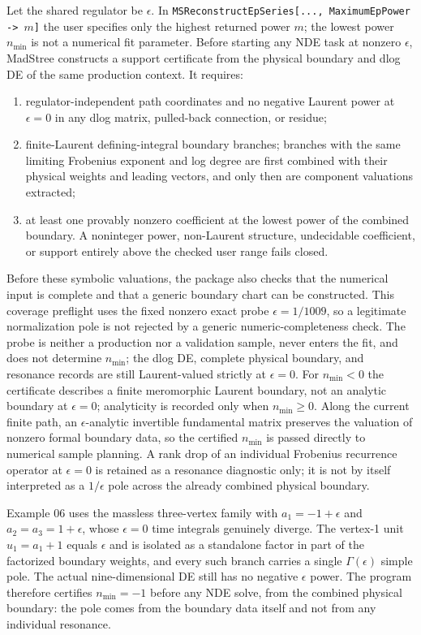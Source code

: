\documentclass[11pt,a4paper]{article}
\begin{document}
Let the shared regulator be $\epsilon$.  In
\texttt{MSReconstructEpSeries[..., MaximumEpPower -> $m$]} the user specifies only the
highest returned power $m$; the lowest power $n_{\min}$ is not a numerical fit parameter.
Before starting any NDE task at nonzero $\epsilon$, MadStree constructs a support certificate
from the physical boundary and dlog DE of the same production context.  It requires:
\begin{enumerate}[label=\arabic*.]
  \item regulator-independent path coordinates and no negative Laurent power at
  $\epsilon=0$ in any dlog matrix, pulled-back connection, or residue;
  \item finite-Laurent defining-integral boundary branches; branches with the same limiting
  Frobenius exponent and log degree are first combined with their physical weights and leading
  vectors, and only then are component valuations extracted;
  \item at least one provably nonzero coefficient at the lowest power of the combined boundary.
  A noninteger power, non-Laurent structure, undecidable coefficient, or support entirely above
  the checked user range fails closed.
\end{enumerate}
Before these symbolic valuations, the package also checks that the numerical input is complete and
that a generic boundary chart can be constructed. This coverage preflight uses the fixed nonzero
exact probe $\epsilon=1/1009$, so a legitimate normalization pole is not rejected by a generic
numeric-completeness check. The probe is neither a production nor a validation sample, never enters
the fit, and does not determine $n_{\min}$; the dlog DE, complete physical boundary, and resonance
records are still Laurent-valued strictly at $\epsilon=0$.
For $n_{\min}<0$ the certificate describes a finite meromorphic Laurent boundary, not an
analytic boundary at $\epsilon=0$; analyticity is recorded only when $n_{\min}\geq0$.
Along the current finite path, an $\epsilon$-analytic invertible fundamental matrix preserves
the valuation of nonzero formal boundary data, so the certified $n_{\min}$ is passed directly
to numerical sample planning.  A rank drop of an individual Frobenius recurrence operator at
$\epsilon=0$ is retained as a resonance diagnostic only; it is not by itself interpreted as a
$1/\epsilon$ pole across the already combined physical boundary.

Example 06 uses the massless three-vertex family with
$a_1=-1+\epsilon$ and $a_2=a_3=1+\epsilon$, whose $\epsilon=0$ time integrals genuinely
diverge.  The vertex-1 unit $u_1=a_1+1$ equals $\epsilon$ and is isolated as a standalone
factor in part of the factorized boundary weights, and every such branch carries a single
$\Gamma(\epsilon)$ simple pole.  The actual nine-dimensional DE still has
no negative $\epsilon$ power.  The program therefore certifies $n_{\min}=-1$ before any NDE
solve, from the combined physical boundary: the pole comes from the boundary data itself and
not from any individual resonance.
\end{document}

